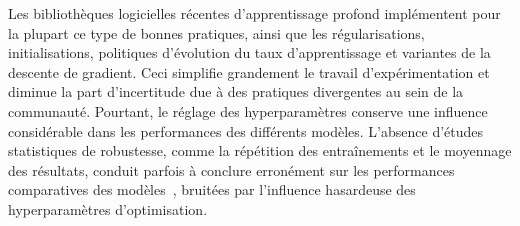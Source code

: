 Les bibliothèques logicielles récentes d'apprentissage profond implémentent pour la plupart ce type de bonnes pratiques, ainsi que les régularisations, initialisations, politiques d'évolution du taux d'apprentissage et variantes de la descente de gradient. Ceci simplifie grandement le travail d'expérimentation et diminue la part d'incertitude due à des pratiques divergentes au sein de la communauté. Pourtant, le réglage des hyperparamètres conserve une influence considérable dans les performances des différents modèles. L'absence d'études statistiques de robustesse, comme la répétition des entraînements et le moyennage des résultats, conduit parfois à conclure erronément sur les performances comparatives des modèles~\cite{oliver_realistic_2018}, bruitées par l'influence hasardeuse des hyperparamètres d'optimisation.

